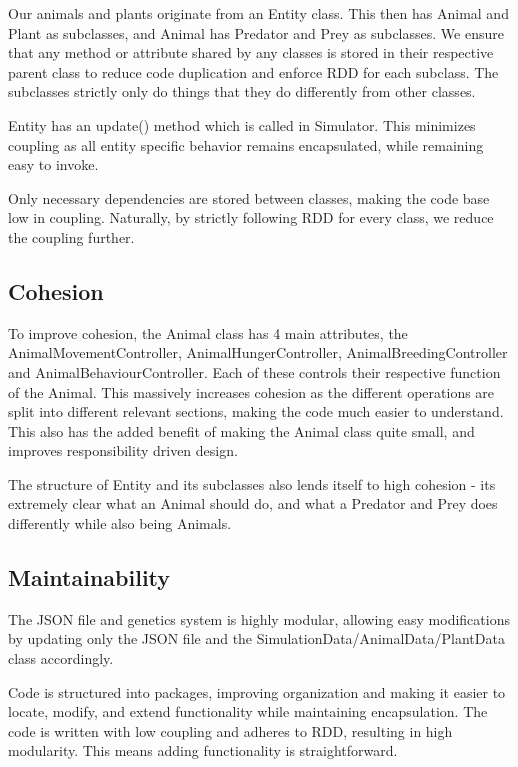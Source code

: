 \documentclass[10pt, a4paper]{scrartcl}
\begin{document}
\begin{multicols}{2}
        Our animals and plants originate from an Entity class. This then has Animal and Plant as subclasses, and Animal has Predator and Prey as subclasses. We ensure that any method or attribute shared by any classes is stored in their respective parent class to reduce code duplication and enforce RDD for each subclass. The subclasses strictly only do things that they do differently from other classes.

        Entity has an update() method which is called in Simulator. This minimizes coupling as all entity specific behavior remains encapsulated, while remaining easy to invoke.

        Only necessary dependencies are stored between classes, making the code base low in coupling. Naturally, by strictly following RDD for every class, we reduce the coupling further.

        \subsection{Cohesion}
        To improve cohesion, the Animal class has 4 main attributes, the AnimalMovementController, AnimalHungerController, AnimalBreedingController and AnimalBehaviourController. Each of these controls their respective function of the Animal. This massively increases cohesion as the different operations are split into different relevant sections, making the code much easier to understand. This also has the added benefit of making the Animal class quite small, and improves responsibility driven design.

        The structure of Entity and its subclasses also lends itself to high cohesion - its extremely clear what an Animal should do, and what a Predator and Prey does differently while also being Animals.

        \subsection{Maintainability}
        The JSON file and genetics system is highly modular, allowing easy modifications by updating only the JSON file and the SimulationData/AnimalData/PlantData class accordingly.

        Code is structured into packages, improving organization and making it easier to locate, modify, and extend functionality while maintaining encapsulation. The code is written with low coupling and adheres to RDD, resulting in high modularity. This means adding functionality is straightforward.


\end{multicols}
\end{document}
